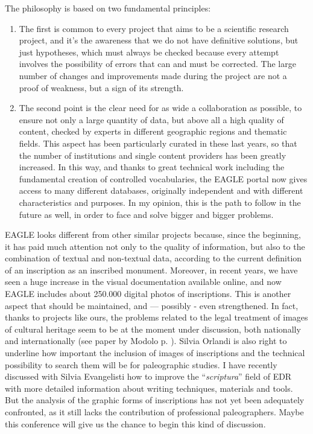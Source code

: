 The philosophy is based on two fundamental principles:
\begin{enumerate}
\item The first is common to every project that aims to be a scientific research project, and it’s the awareness that we do not have definitive solutions, but just hypotheses, which must always be checked because every attempt involves the possibility of errors that can and must be corrected. The large number of changes and improvements made during the project are not a proof of weakness, but a sign of its strength.
\item The second point is the clear need for as wide a collaboration as possible, to ensure not only a large quantity of data, but above all a high quality of content, checked by experts in different geographic regions and thematic fields. This aspect has been particularly curated in these last years, so that the number of institutions and single content providers has been greatly increased. In this way, and thanks to great technical work including the fundamental creation of controlled vocabularies, the EAGLE portal now gives access to many different databases, originally independent and with different characteristics and purposes. In my opinion, this is the path to follow in the future as well, in order to face and solve bigger and bigger problems.
\end{enumerate}

EAGLE looks different from other similar projects because, since the beginning, it has paid much attention not only to the quality of information, but also to the combination of textual and non-textual data, according to the current definition of an inscription as an inscribed monument. Moreover, in recent years, we have seen a huge increase in the visual documentation available online, and now EAGLE includes about 250.000 digital photos of inscriptions. This is another aspect that should be maintained, and --- possibly - even strengthened. In fact, thanks to projects like ours, the problems related to the legal treatment of images of cultural heritage seem to be at the moment under discussion, both nationally and internationally (see paper by Modolo p. \pageref{p38}). Silvia Orlandi is also right to underline how important the inclusion of images of inscriptions and the technical possibility to search them will be for paleographic studies. I have recently discussed with Silvia Evangelisti how to improve the ``\emph{scriptura}'' field of EDR with more detailed information about writing techniques, materials and tools. But the analysis of the graphic forms of inscriptions has not yet been adequately confronted, as it still lacks the contribution of professional paleographers. Maybe this conference will give us the chance to begin this kind of discussion.

